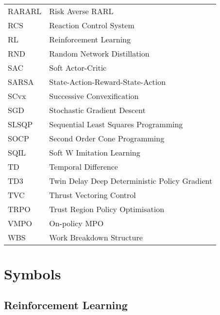 \begin{longtable}{p{2.5cm}p{12cm}}
    RARARL & Risk Averse RARL \\ %
    RCS & Reaction Control System \\ %
    RL & Reinforcement Learning \\ %
    RND & Random Network Distillation \\ %
    SAC & Soft Actor-Critic \\ %
    SARSA & State-Action-Reward-State-Action \\ %
    SCvx & Successive Convexification \\ %
    SGD & Stochastic Gradient Descent \\ %
    SLSQP & Sequential Least Squares Programming \\ %
    SOCP & Second Order Cone Programming \\ %
    SQIL & Soft W Imitation Learning \\ %
    TD & Temporal Difference \\ %
    TD3 & Twin Delay Deep Deterministic Policy Gradient \\ %
    TVC & Thrust Vectoring Control \\ %
    TRPO & Trust Region Policy Optimisation \\ %
    VMPO & On-policy MPO \\ %
    WBS & Work Breakdown Structure \\ %
    \bottomrule
\end{longtable}

\section*{Symbols}

\subsection*{Reinforcement Learning}


